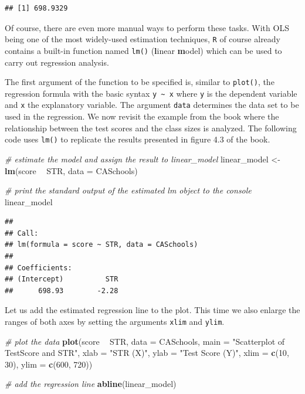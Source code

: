 \documentclass[]{book}
\newenvironment{Shaded}{\begin{snugshade}}{\end{snugshade}}
\newcommand{\KeywordTok}[1]{\textcolor[rgb]{0.13,0.29,0.53}{\textbf{#1}}}
\newcommand{\DataTypeTok}[1]{\textcolor[rgb]{0.13,0.29,0.53}{#1}}
\newcommand{\DecValTok}[1]{\textcolor[rgb]{0.00,0.00,0.81}{#1}}
\newcommand{\StringTok}[1]{\textcolor[rgb]{0.31,0.60,0.02}{#1}}
\newcommand{\CommentTok}[1]{\textcolor[rgb]{0.56,0.35,0.01}{\textit{#1}}}
\newcommand{\OperatorTok}[1]{\textcolor[rgb]{0.81,0.36,0.00}{\textbf{#1}}}
\newcommand{\NormalTok}[1]{#1}
\theoremstyle{definition}
\theoremstyle{definition}
\theoremstyle{definition}
\theoremstyle{remark}
\begin{document}
\begin{verbatim}
## [1] 698.9329
\end{verbatim}

Of course, there are even more manual ways to perform these tasks. With
OLS being one of the most widely-used estimation techniques, \texttt{R}
of course already contains a built-in function named \texttt{lm()}
(\textbf{l}inear \textbf{m}odel) which can be used to carry out
regression analysis.

The first argument of the function to be specified is, similar to
\texttt{plot()}, the regression formula with the basic syntax
\texttt{y \textasciitilde{} x} where \texttt{y} is the dependent
variable and \texttt{x} the explanatory variable. The argument
\texttt{data} determines the data set to be used in the regression. We
now revisit the example from the book where the relationship between the
test scores and the class sizes is analyzed. The following code uses
\texttt{lm()} to replicate the results presented in figure 4.3 of the
book.

\begin{Shaded}
\begin{Highlighting}[]
\CommentTok{# estimate the model and assign the result to linear_model}
\NormalTok{linear_model <-}\StringTok{ }\KeywordTok{lm}\NormalTok{(score }\OperatorTok{~}\StringTok{ }\NormalTok{STR, }\DataTypeTok{data =}\NormalTok{ CASchools)}

\CommentTok{# print the standard output of the estimated lm object to the console }
\NormalTok{linear_model}
\end{Highlighting}
\end{Shaded}

\begin{verbatim}
## 
## Call:
## lm(formula = score ~ STR, data = CASchools)
## 
## Coefficients:
## (Intercept)          STR  
##      698.93        -2.28
\end{verbatim}

Let us add the estimated regression line to the plot. This time we also
enlarge the ranges of both axes by setting the arguments \texttt{xlim}
and \texttt{ylim}.

\begin{Shaded}
\begin{Highlighting}[]
\CommentTok{# plot the data}
\KeywordTok{plot}\NormalTok{(score }\OperatorTok{~}\StringTok{ }\NormalTok{STR, }
     \DataTypeTok{data =}\NormalTok{ CASchools,}
     \DataTypeTok{main =} \StringTok{"Scatterplot of TestScore and STR"}\NormalTok{, }
     \DataTypeTok{xlab =} \StringTok{"STR (X)"}\NormalTok{,}
     \DataTypeTok{ylab =} \StringTok{"Test Score (Y)"}\NormalTok{,}
     \DataTypeTok{xlim =} \KeywordTok{c}\NormalTok{(}\DecValTok{10}\NormalTok{, }\DecValTok{30}\NormalTok{),}
     \DataTypeTok{ylim =} \KeywordTok{c}\NormalTok{(}\DecValTok{600}\NormalTok{, }\DecValTok{720}\NormalTok{))}

\CommentTok{# add the regression line}
\KeywordTok{abline}\NormalTok{(linear_model) }
\end{Highlighting}
\end{Shaded}
\end{document}
